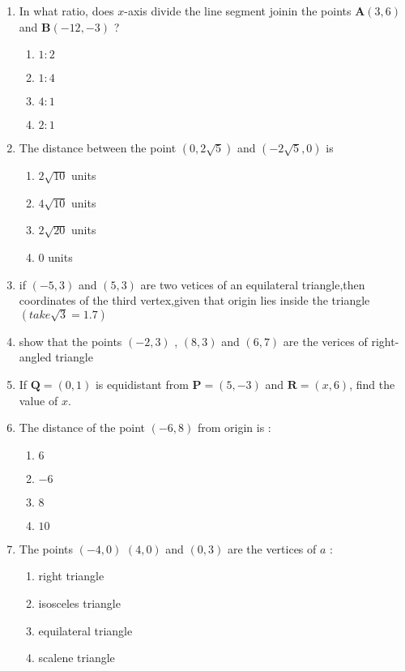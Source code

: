 \documentclass{article}
\let\vec\mathbf
\begin{document}
\begin{enumerate}
\item In what ratio, does $x$-axis divide the line segment joinin the points $\vec{A}(3,6)$ and $\vec{B}(-12, -3)$ ?
\begin{multicols}{2}
\begin{enumerate}
\item $1:2$
\item $1:4$
\item $4:1$ 
\item $2:1$
\end{enumerate}
\end{multicols}

\item The distance between the point $(0,2\sqrt{5})$ and $(-2\sqrt{5},0)$ is 
\begin{multicols}{2}
\begin{enumerate}
\item $2\sqrt{10}$ units
\item $4\sqrt{10}$ units
\item $2\sqrt{20}$ units
\item $0$ units
\end{enumerate}
\end{multicols}

\item if $(-5,3)$ and $(5,3)$ are two vetices of an equilateral triangle,then coordinates of the third vertex,given that origin lies inside the triangle $(take \sqrt{3}=1.7)$
\item show that the points $(-2,3)$ , $(8,3)$ and $(6,7)$ are the verices of right-angled triangle
\item If $\vec{Q} =(0,1)$ is equidistant from $\vec{P} = (5,-3)$ and $\vec{R} =(x,6)$, find the value of $x$.
\item The distance of the point $(-6,8)$ from origin is :
\begin{multicols}{2}
\begin{enumerate}
\item $6$
\item $-6$
\item $8$
\item $10$
\end{enumerate}
\end{multicols}

\item The points $(-4,0)$ $(4,0)$ and $(0,3)$ are the vertices of $a$ :
\begin{multicols}{2}
\begin{enumerate}
\item right triangle
\item isosceles triangle
\item equilateral triangle
\item scalene triangle
\end{enumerate}
\end{multicols}

\end{enumerate}
\end{document}
